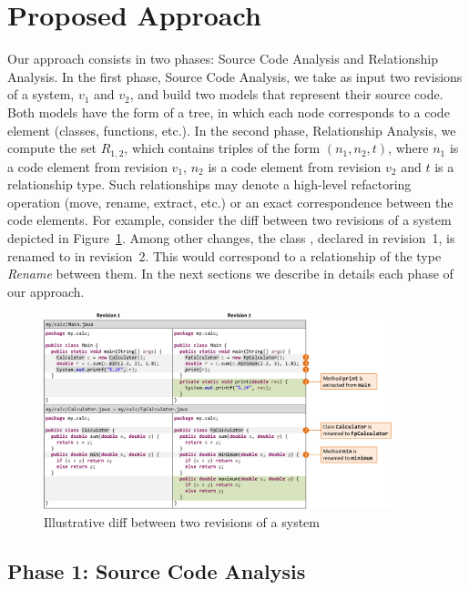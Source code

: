 \section{Proposed Approach}

Our approach consists in two phases: Source Code Analysis and Relationship Analysis.
In the first phase, Source Code Analysis, we take as input two revisions of a system, $v_1$ and $v_2$, and build two models that represent their source code.
Both models have the form of a tree, in which each node corresponds to a code element (classes, functions, etc.).
In the second phase, Relationship Analysis, we compute the set $R_{1,2}$, which contains triples of the form $(n_1, n_2, t)$, where $n_1$ is a code element from revision $v_1$, $n_2$ is a code element from revision $v_2$ and $t$ is a relationship type.
Such relationships may denote a high-level refactoring operation (move, rename, extract, etc.) or an exact correspondence between the code elements.
For example, consider the diff between two revisions of a system depicted in Figure~\ref{FigDiff1}.
Among other changes, the class , declared in revision~1, is renamed to  in revision~2. This would correspond to a relationship of the type \emph{Rename} between them.
In the next sections we describe in details each phase of our approach.

\begin{figure}[htb]
\centering
\includegraphics[width=0.9\textwidth]{img/diff1.pdf}
\caption{Illustrative diff between two revisions of a system}
\label{FigDiff1}
\end{figure}


\subsection{Phase 1: Source Code Analysis}


